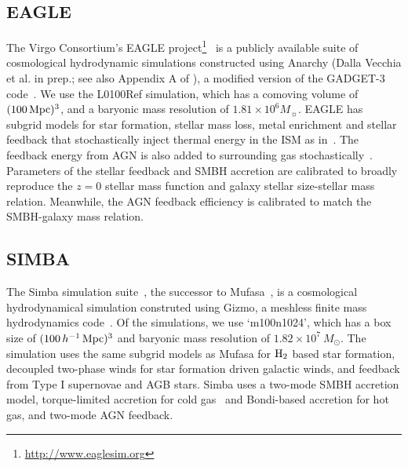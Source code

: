 \subsection{EAGLE} \label{sec:eagle} 
The Virgo Consortium's EAGLE
project\footnote{\url{http://www.eaglesim.org}}~\citep{schaye2015, crain2015,
mcalpine2016} is a publicly available suite of cosmological hydrodynamic
simulations constructed using {\sc Anarchy} (Dalla Vecchia et al. in prep.; 
see also Appendix A of \citealt{schaye2015}), a modified version of the 
{\sc GADGET-3} code~\citep{springel2005}. We use the L0100Ref simulation,
which has a comoving volume of $(100\,{\rm Mpc})^3$, and a baryonic mass resolution of $1.81\times 10^6M_{\sun}$. %
EAGLE has subgrid models for star formation, stellar mass loss, metal enrichment
and stellar feedback that stochastically inject thermal energy in the ISM as
in~\citep{dallavecchia2012}. The feedback energy from AGN is also added to
surrounding gas stochastically~\citep{booth2009}. Parameters of the stellar 
feedback and SMBH accretion are calibrated to broadly reproduce the $z=0$ 
stellar mass function and galaxy stellar size-stellar mass relation. Meanwhile, 
the AGN feedback efficiency is calibrated to match the SMBH-galaxy mass relation. 

\subsection{SIMBA} \label{sec:simba}
The {\sc Simba} simulation suite~\citep{dave2019}, the successor to {\sc
Mufasa}~\citep{dave2016, dave2017, dave2017a}, is a cosmological hydrodynamical
simulation construted using {\sc Gizmo}, a meshless finite mass hydrodynamics 
code~\citep{hopkins2015, hopkins2017}. Of the simulations, we use
`m100n1024', which has a box size of $(100\,h^{-1}\,{\rm Mpc})^3$ and baryonic 
mass resolution of $1.82 \times 10^7\ M_\odot$. The simulation uses the same
subgrid models as {\sc Mufasa} for $\rm H_2$ based star formation, decoupled
two-phase winds for star formation driven galactic winds, and feedback from 
Type I supernovae and AGB stars. {\sc Simba} uses a two-mode SMBH accretion 
model, torque-limited accretion for cold gas~\citep{angles-alcazar2017} and 
Bondi-based accretion for hot gas, and two-mode AGN feedback. %

